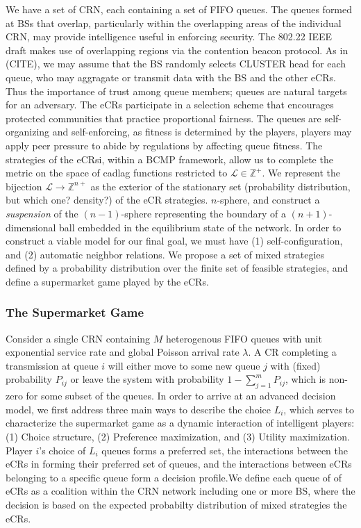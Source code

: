 \documentclass[10pt]{article}
\newcommand{\mcL}{\mathcal{L}}
\theoremstyle{definition}
\begin{document}
We have a set of CRN, each containing a set of FIFO queues. 
The queues formed at BSs that overlap, particularly within the overlapping areas 
of the individual CRN, may provide intelligence useful in enforcing
security. The 802.22 IEEE draft makes use of overlapping regions via the
contention beacon protocol. As in (CITE), we may assume that the BS randomly
selects CLUSTER head for each queue, who may aggragate or transmit data with
the BS and the other eCRs. Thus the importance of trust among queue members;
queues are natural targets for an adversary. 
The eCRs participate in a selection scheme that
encourages protected communities that practice proportional fairness. The queues
are self-organizing and
self-enforcing, as fitness is determined by the players,  players may apply peer
pressure to abide by regulations by affecting queue fitness.
The strategies of the eCRsi, within a BCMP framework, allow us to complete the
metric on the space of cadlag functions restricted to $\mcL \in \mathbb{Z}^+$.
We represent the bijection $\mcL \rightarrow \mathbb{Z}^{n+}$ as the exterior of
the stationary set (probability distribution, but which one? density?) of the eCR strategies.
$n$-sphere, and construct a \emph{suspension} of the $(n-1)$-sphere representing
the boundary of a $(n+1)$-dimensional ball embedded in the equilibrium state of
the network. 
In order to construct a viable model for our 
final goal, we must have (1) self-configuration, and (2) automatic neighbor relations. 
We propose a set of mixed
strategies defined by a probability distribution over
the finite set of feasible strategies, and define a 
supermarket game played by the eCRs.

\subsubsection{The Supermarket Game}

Consider a single CRN containing $M$ heterogenous FIFO queues with unit exponential service rate and global
Poisson arrival rate $\lambda$. A CR completing a transmission at queue $i$ will either 
move to some new queue $j$ with (fixed) probability $P_{ij}$ or leave the system 
with probability $\displaystyle 1-\sum _{j=1}^{m}P_{ij}$, which is non-zero for some subset of the queues. 
In order to arrive at an advanced decision model, we first address three main ways to describe the choice $L_i$, which serves to characterize the
supermarket game as a dynamic interaction of intelligent players: (1) Choice structure,
(2) Preference maximization, and (3) Utility maximization.
Player $i$'s choice of $L_i$ queues forms a preferred set, the interactions between the eCRs in forming their
preferred set of queues, and the interactions between eCRs belonging to a specific
queue form a decision profile.We define each queue of of eCRs as a coalition within the CRN network including one or more
BS, where the decision is based on the expected probabilty distribution of
mixed strategies the eCRs.
\end{document}
